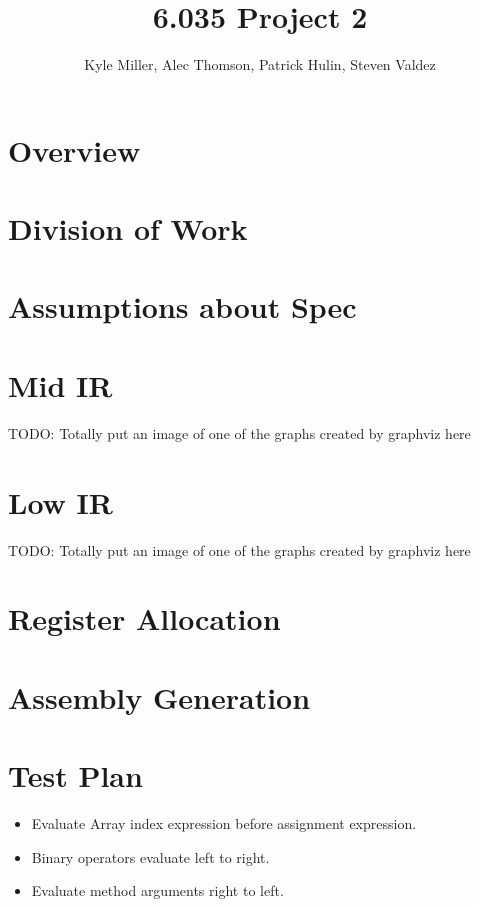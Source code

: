 \documentclass[11pt]{article}
\title{6.035 Project 2}
\author{Kyle Miller, Alec Thomson, Patrick Hulin, Steven Valdez}
\begin{document}
 
\maketitle

\section {Overview}


\section{Division of Work} 
\label{sec:division}

\section{Assumptions about Spec} 
\label{sec:assumptions}

\section {Mid IR}

TODO: Totally put an image of one of the graphs created by graphviz here 

\section {Low IR} 

TODO: Totally put an image of one of the graphs created by graphviz here 

\section {Register Allocation} 

\section {Assembly Generation}  

\section {Test Plan}


\begin{itemize}
\item Evaluate Array index expression before assignment expression. 
\item Binary operators evaluate left to right. 
\item Evaluate method arguments right to left. 
\end{itemize}
\end{document}
